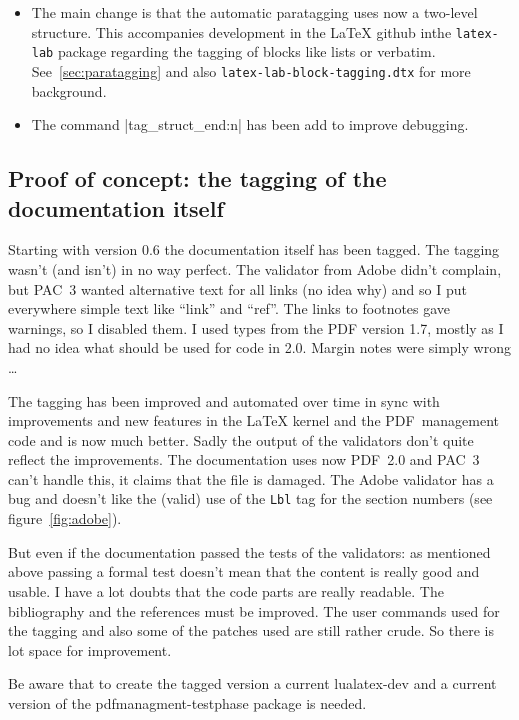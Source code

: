 \documentclass[DIV=12,parskip=half-,bibliography=totoc,a4paper]{article}
\newcommand\PDF{PDF}
\begin{document}
\begin{itemize}
\item The main change is that the automatic paratagging uses now a two-level structure. This accompanies development
in the LaTeX github inthe \texttt{latex-lab} package regarding the tagging of blocks like lists or verbatim.
See~\ref{sec:paratagging} and also \texttt{latex-lab-block-tagging.dtx} for more background.

\item The command |tag_struct_end:n| has been add to improve debugging.
\end{itemize}


\subsection{Proof of concept: the tagging of the documentation itself}

Starting with version 0.6 the documentation itself has been tagged. The 
tagging wasn't (and isn't) in no way perfect. The validator from Adobe didn't 
complain, but PAC~3 wanted alternative text for all links (no idea why) and 
so I put everywhere simple text like \enquote{link} and \enquote{ref}. The 
links to footnotes gave warnings, so I disabled them. I used types from the 
\PDF{} version 1.7, mostly as I had no idea what should be used for code in 
2.0. Margin notes were simply wrong \ldots 

The tagging has been improved and automated over time in sync with 
improvements and new features in the LaTeX kernel and the \PDF\ management 
code and is now much better. Sadly the output of the validators don't quite 
reflect the improvements. The documentation uses now \PDF~2.0  and PAC~3 
can't handle this, it claims that the file is damaged. The Adobe validator 
has a bug and doesn't like the (valid) use of  the \texttt{Lbl} tag for the 
section numbers (see figure~\ref{fig:adobe}).  



But even if the documentation passed the tests of the validators:  as mentioned above passing a formal test doesn't mean that the content is really good and usable. I have a lot doubts that the code parts are really readable. The bibliography and the references must be improved. The user commands used for the tagging and also some of the patches used are still rather crude. So there is lot space for improvement.

\begin{tcolorbox}[before upper=\tagpdfparaOn]
Be aware that to create the tagged version a current lualatex-dev and a current version of the pdfmanagment-testphase package is needed.
\end{tcolorbox}
\end{document}
